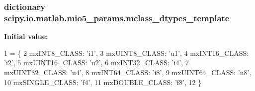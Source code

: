 \subsubsection[{mclass\+\_\+dtypes\+\_\+template}]{\setlength{\rightskip}{0pt plus 5cm}dictionary scipy.\+io.\+matlab.\+mio5\+\_\+params.\+mclass\+\_\+dtypes\+\_\+template}\label{namespacescipy_1_1io_1_1matlab_1_1mio5__params_a9357fae402de167deba8baced179d6dc}
{\bfseries Initial value\+:}
\begin{DoxyCode}
1 = \{
2     mxINT8\_CLASS: \textcolor{stringliteral}{'i1'},
3     mxUINT8\_CLASS: \textcolor{stringliteral}{'u1'},
4     mxINT16\_CLASS: \textcolor{stringliteral}{'i2'},
5     mxUINT16\_CLASS: \textcolor{stringliteral}{'u2'},
6     mxINT32\_CLASS: \textcolor{stringliteral}{'i4'},
7     mxUINT32\_CLASS: \textcolor{stringliteral}{'u4'},
8     mxINT64\_CLASS: \textcolor{stringliteral}{'i8'},
9     mxUINT64\_CLASS: \textcolor{stringliteral}{'u8'},
10     mxSINGLE\_CLASS: \textcolor{stringliteral}{'f4'},
11     mxDOUBLE\_CLASS: \textcolor{stringliteral}{'f8'},
12     \}
\end{DoxyCode}
\hypertarget{namespacescipy_1_1io_1_1matlab_1_1mio5__params_af9b5207c0daee91d419d4774a7ad36e5}{}
